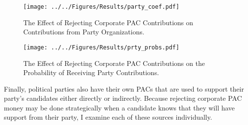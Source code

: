 \documentclass[12pt]{article}
\begin{document}
\begin{figure*}[!htb]
    \centering
    \begin{subfigure}[b]{0.65\textwidth}
        \centering
        \texttt{[image: ../../Figures/Results/party\_coef.pdf]}
        \caption{The Effect of Rejecting Corporate PAC Contributions on Contributions from Party Organizations.}
        \label{fig: party coefs}
    \end{subfigure}
    
    \begin{subfigure}[b]{0.65\textwidth}
        \centering
        \texttt{[image: ../../Figures/Results/prty\_probs.pdf]}
        \caption{The Effect of Rejecting Corporate PAC Contributions on the Probability of Receiving Party Contributions.}
        \label{fig: party probs}
    \end{subfigure}
    \caption{\textbf{The Effect of Rejecting Corporate PAC Contributions on Contributions and the Probability of Receiving Money from Political Parties.} These figures present the posterior distributions estimated for a candidate that pledges to reject corporate PAC contributions. The dot shows the median coefficient estimate and the intervals show the 50\% and 89\% highest density intervals. Figure \ref{fig: party coefs} shows that candidates who differ by whether they pledge to reject corporate PAC contributions are expected to have fewer contributions from leadership PACs and more contributions from candidate committees. Figure \ref{fig: party probs} shows that the model makes no meaningful prediction for how contributions from candidate committees, leadership PACs, or political parties differ between candidates who differ in their position towards corporate PAC contributions. See Table \ref{tbl: party results} for the formal estimates.}
    \label{fig: party results}
\end{figure*}

Finally, political parties also have their own PACs that are used to support their party's candidates either directly or indirectly. Because rejecting corporate PAC money may be done strategically when a candidate knows that they will have support from their party, I examine each of these sources individually.  
\end{document}
